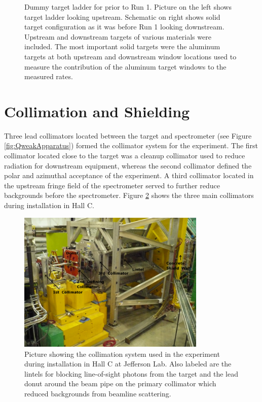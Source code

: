 \begin{figure}[h]
\begin{minipage}{0.48\textwidth}
\end{minipage}
\caption{\label{fig:dummy}Dummy target ladder for \Qs prior to Run 1. Picture on the left shows target ladder looking upstream. Schematic on right shows solid target configuration as it was before Run 1 looking downstream. Upstream and downstream targets of various materials were included. The most important solid targets were the aluminum targets at both upstream and downstream window locations used to measure the contribution of the aluminum target windows to the measured rates.}
\end{figure} 

\section{Collimation and Shielding}
Three lead collimators located between the target and spectrometer (see Figure \ref{fig:QweakApparatus}) formed the collimator system for the \Qs experiment. The first collimator located close to the target was a cleanup collimator used to reduce radiation for downstream equipment, whereas the second collimator defined the polar and azimuthal acceptance of the experiment. A third collimator located in the upstream fringe field of the spectrometer served to further reduce backgrounds before the spectrometer. Figure \ref{fig:collimators} shows the three main collimators during installation in Hall C. 
\begin{figure}[ht]
\centering
\includegraphics[width=0.8\textwidth]{Pictures/installed_collimators.png}
\caption{Picture showing the collimation system used in the \Qs experiment during installation in Hall C at Jefferson Lab. Also labeled are the lintels for blocking line-of-sight photons from the target and the lead donut around the beam pipe on the primary collimator which reduced backgrounds from beamline scattering.}
\label{fig:collimators}
\end{figure} 

